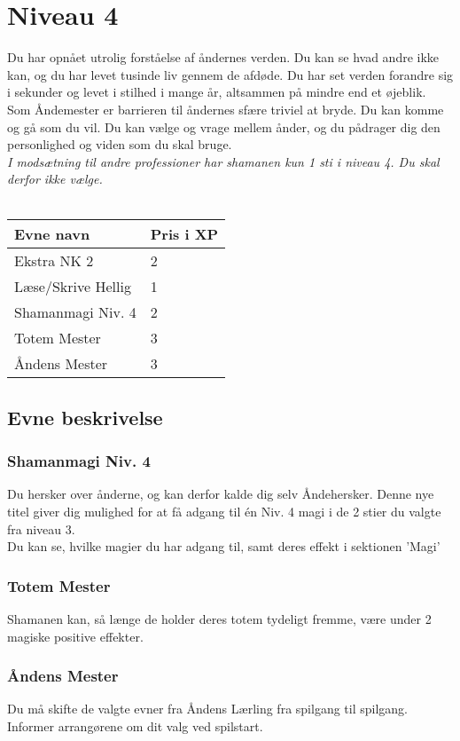 \chapter{Niveau 4}
Du har opnået utrolig forståelse af åndernes verden. Du kan se hvad andre ikke kan, og du har levet tusinde liv gennem de afdøde. Du har set verden forandre sig i sekunder og levet i stilhed i mange år, altsammen på mindre end et øjeblik.\\
Som Åndemester er barrieren til åndernes sfære triviel at bryde. Du kan komme og gå som du vil. Du kan vælge og vrage mellem ånder, og du pådrager dig den personlighed og viden som du skal bruge.\\ 


\emph{I modsætning til andre professioner har shamanen kun 1 sti i niveau 4. Du skal derfor ikke vælge.}\\\\

\begin{table}[H]
    \centering
    \begin{tabular}{|p{}|p{}|}
    \rowcolor{cerulean!80}\hline
        Evne navn & Pris i XP \\\hline
        Ekstra NK 2 & 2 \\\hline
        Læse/Skrive Hellig& 1 \\\hline
        Shamanmagi Niv. 4 & 2 \\\hline
        Totem Mester & 3 \\\hline
        Åndens Mester& 3 \\\hline
    \end{tabular}
\end{table}


\section{Evne beskrivelse}





\subsection{Shamanmagi Niv. 4}
Du hersker over ånderne, og kan derfor kalde dig selv Åndehersker. Denne nye titel giver dig mulighed for at få adgang til én Niv. 4 magi i de 2 stier du valgte fra niveau 3.\\
Du kan se, hvilke magier du har adgang til, samt deres effekt i sektionen 'Magi'\\

\subsection{Totem Mester}
Shamanen kan, så længe de holder deres totem tydeligt fremme, være under 2 magiske positive effekter.

\subsection{Åndens Mester}
Du må skifte de valgte evner fra Åndens Lærling fra spilgang til spilgang. Informer arrangørene om dit valg ved spilstart.





